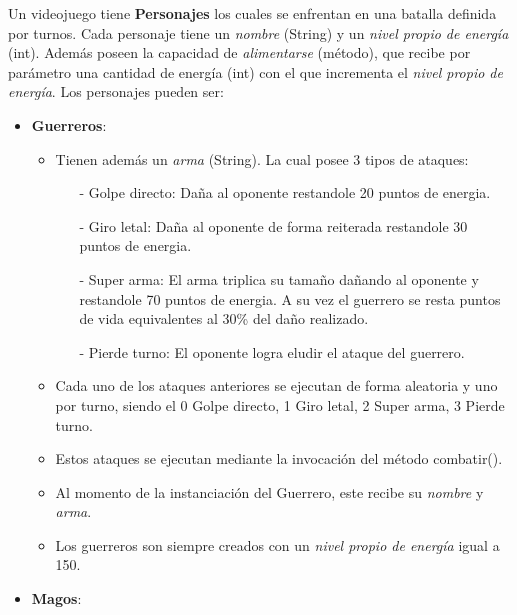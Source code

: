 \documentclass{exam}
\begin{document}
       \item Un videojuego tiene \textbf{Personajes} los cuales se enfrentan en una batalla definida por turnos. Cada personaje tiene un \emph{nombre} (String) y un
       \emph{nivel propio de energ\'ia} (int). Adem\'as poseen la capacidad de  \emph{alimentarse} (m\'etodo), que recibe por par\'ametro
       una cantidad de energ\'ia (int) con el que incrementa el \emph{nivel propio de energ\'ia}. Los personajes pueden ser:
       \begin{itemize}
         \item \textbf{Guerreros}:
         \begin{itemize}
           \item Tienen adem\'as un \emph{arma} (String). La cual posee 3 tipos de ataques:
           \begin{enumerate}
             \item[-] Golpe directo: Da\~na al oponente restandole 20 puntos de energia.
             \item[-] Giro letal: Da\~na al oponente de forma reiterada restandole 30 puntos de energia.
             \item[-] Super arma: El arma triplica su tama\~no da\~nando al oponente y restandole 70 puntos de energia. A su vez el guerrero se resta puntos de vida equivalentes al 30\% del da\~no realizado.
             \item[-] Pierde turno: El oponente logra eludir el ataque del guerrero.
           \end{enumerate}
           \item Cada uno de los ataques anteriores se ejecutan  de forma aleatoria y uno por turno, siendo el 0 Golpe directo, 1 Giro letal, 2 Super arma, 3 Pierde turno.
           \item Estos ataques se ejecutan mediante la invocaci\'on del m\'etodo combatir().
           \item Al momento de la instanciaci\'on del Guerrero, este recibe su  \emph{nombre} y \emph{arma}.
           \item Los guerreros son siempre creados con un \emph{nivel
               propio de energ\'ia} igual a 150.
        \end{itemize}

         \item \textbf{Magos}:


\end{itemize}
\end{document}

